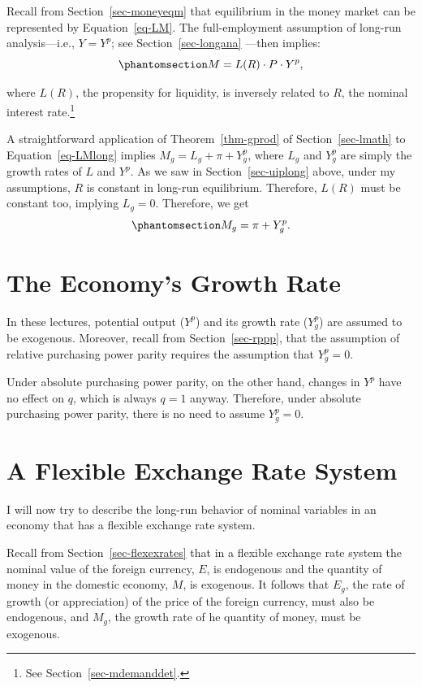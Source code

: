 \documentclass[
  letterpaper,
]{book}
\theoremstyle{plain}
\theoremstyle{remark}
\begin{document}
Recall from Section~\ref{sec-moneyeqm} that equilibrium in the money
market can be represented by Equation~\ref{eq-LM}. The full-employment
assumption of long-run analysis---i.e., \(Y=Y^p\); see
Section~\ref{sec-longana} ---then implies:
\begin{equation}\phantomsection\label{eq-LMlong}{
M=L(R)\cdot P\cdot Y^p,
}\end{equation}

where \(L(R)\), the propensity for liquidity, is inversely related to
\(R\), the nominal interest rate.\footnote{See
  Section~\ref{sec-mdemanddet}.}

A straightforward application of Theorem~\ref{thm-gprod} of
Section~\ref{sec-lmath} to Equation~\ref{eq-LMlong} implies
\(M_g=L_g+\pi+ Y^p_g\), where \(L_g\) and \(Y^p_g\) are simply the
growth rates of \(L\) and \(Y^p\). As we saw in
Section~\ref{sec-uiplong} above, under my assumptions, \(R\) is constant
in long-run equilibrium. Therefore, \(L(R)\) must be constant too,
implying \(L_g=0\). Therefore, we get
\begin{equation}\phantomsection\label{eq-mg}{
M_g=\pi+ Y^p_g.
}\end{equation}

\section{The Economy's Growth Rate}\label{sec-ypg}

In these lectures, potential output (\(Y^p\)) and its growth rate
(\(Y^p_g\)) are assumed to be exogenous. Moreover, recall from
Section~\ref{sec-rppp}, that the assumption of relative purchasing power
parity requires the assumption that \(Y^p_g=0\).

Under absolute purchasing power parity, on the other hand, changes in
\(Y^p\) have no effect on \(q\), which is always \(q=1\) anyway.
Therefore, under absolute purchasing power parity, there is no need to
assume \(Y^p_g=0\).

\section{A Flexible Exchange Rate System}\label{sec-flex}

I will now try to describe the long-run behavior of nominal variables in
an economy that has a flexible exchange rate system.

Recall from Section~\ref{sec-flexexrates} that in a flexible exchange
rate system the nominal value of the foreign currency, \(E\), is
endogenous and the quantity of money in the domestic economy, \(M\), is
exogenous. It follows that \(E_g\), the rate of growth (or appreciation)
of the price of the foreign currency, must also be endogenous, and
\(M_g\), the growth rate of he quantity of money, must be exogenous.
\end{document}
